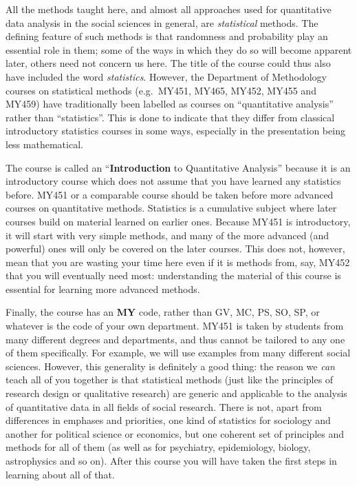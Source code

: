 \documentclass[11pt,a4paper,openany]{book}
\begin{document}
All the methods taught here, and almost all approaches used for
quantitative data analysis in the social sciences in general, are
\emph{statistical} methods. The defining feature of such methods is that
randomness and probability play an essential role in them; some of the
ways in which they do so will become apparent later, others need not
concern us here. The title of the course could thus also have included
the word \emph{statistics}. However, the Department of Methodology
courses on statistical methods (e.g.~MY451, MY465, MY452, MY455 and
MY459) have traditionally been labelled as courses on ``quantitative
analysis'' rather than ``statistics''. This is done to indicate that
they differ from classical introductory statistics courses in some ways,
especially in the presentation being less mathematical.

The course is called an ``\textbf{Introduction} to Quantitative
Analysis'' because it is an introductory course which does not assume
that you have learned any statistics before. MY451 or a comparable
course should be taken before more advanced courses on quantitative
methods. Statistics is a cumulative subject where later courses build on
material learned on earlier ones. Because MY451 is introductory, it will
start with very simple methods, and many of the more advanced (and
powerful) ones will only be covered on the later courses. This does not,
however, mean that you are wasting your time here even if it is methods
from, say, MY452 that you will eventually need most: understanding the
material of this course is essential for learning more advanced methods.

Finally, the course has an \textbf{MY} code, rather than GV, MC, PS, SO,
SP, or whatever is the code of your own department. MY451 is taken by
students from many different degrees and departments, and thus cannot be
tailored to any one of them specifically. For example, we will use
examples from many different social sciences. However, this generality
is definitely a good thing: the reason we \emph{can} teach all of you
together is that statistical methods (just like the principles of
research design or qualitative research) are generic and applicable to
the analysis of quantitative data in all fields of social research.
There is not, apart from differences in emphases and priorities, one
kind of statistics for sociology and another for political science or
economics, but one coherent set of principles and methods for all of
them (as well as for psychiatry, epidemiology, biology, astrophysics and
so on). After this course you will have taken the first steps in
learning about all of that.
\end{document}
